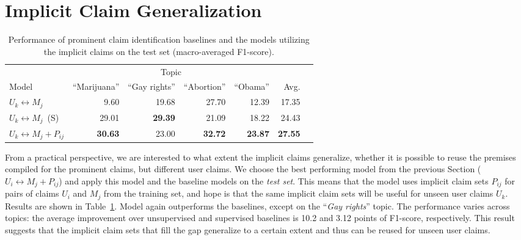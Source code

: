 \section{Implicit Claim Generalization}
\label{sec:argpremise_generalization}

\begin{table}[t]
\begin{center}
{\small
\setlength{\tabcolsep}{5.9pt}
\begin{tabular}{lrrrrrr}
\toprule
&\multicolumn{4}{c}{Topic}\\
\cmidrule(lr){2-5}
Model & ``Marijuana'' & ``Gay rights''  & ``Abortion'' & ``Obama'' & Avg. \\
\midrule
$U_k \leftrightarrow M_j$   & 9.60          & 19.68        & 27.70        & 12.39        & 17.35 \\
$U_k \leftrightarrow M_j$\ (S)   & 29.01         & {\bf 29.39}  & 21.09        & 18.22        & 24.43 \\
$U_k \leftrightarrow M_j + P_{ij}$  & {\bf 30.63}   & 23.00        & {\bf 32.72}  & {\bf 23.87}  & {\bf 27.55} \\
\bottomrule
\end{tabular}}
\caption{Performance of prominent claim identification baselines and the models utilizing the
implicit claims on the test set (macro-averaged F1-score).}
\label{tab:argpremise_generalization}
\end{center}
\end{table}

From a practical perspective, we are interested to what extent the implicit claims
generalize, whether it is possible to reuse the premises compiled for the
prominent claims, but different user claims. 
We choose the best performing model from the previous Section ($U_i
\leftrightarrow M_j + P_{ij}$)
and apply this model and the baseline models on the \emph{test set}. 
This means that the model uses implicit claim sets $P_{ij}$ for pairs of claims
$U_i$ and $M_j$ from the training set, and hope is that the same implicit claim
sets will be useful for unseen user claims $U_k$. 
Results are shown in Table~\ref{tab:argpremise_generalization}. 
Model again outperforms the baselines, except on the ``\emph{Gay rights}'' topic. 
The performance varies across topics: the average improvement over unsupervised
and supervised baselines is 10.2 and 3.12 points of F1-score, respectively. 
This result suggests that the implicit claim sets that fill the gap generalize to a certain
extent and thus can be reused for unseen user claims. 

